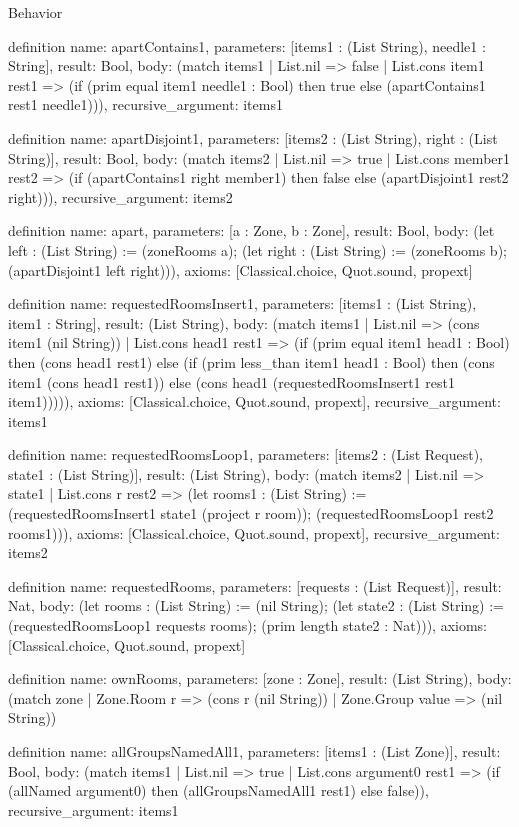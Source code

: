 \begin{lexlean}{Behavior}
\begin{semanticmodule}
definition{
  name: apartContains1,
  parameters: [items1 : (List String), needle1 : String],
  result: Bool,
  body: (match items1
    | List.nil => false
    | List.cons item1 rest1 => (if (prim equal item1 needle1 : Bool) then true else (apartContains1 rest1 needle1))),
  recursive_argument: items1
}

definition{
  name: apartDisjoint1,
  parameters: [items2 : (List String), right : (List String)],
  result: Bool,
  body: (match items2
    | List.nil => true
    | List.cons member1 rest2 => (if (apartContains1 right member1) then false else (apartDisjoint1 rest2 right))),
  recursive_argument: items2
}

definition{
  name: apart,
  parameters: [a : Zone, b : Zone],
  result: Bool,
  body: (let left : (List String) := (zoneRooms a); (let right : (List String) := (zoneRooms b); (apartDisjoint1 left right))),
  axioms: [Classical.choice, Quot.sound, propext]
}

definition{
  name: requestedRoomsInsert1,
  parameters: [items1 : (List String), item1 : String],
  result: (List String),
  body: (match items1
    | List.nil => (cons item1 (nil String))
    | List.cons head1 rest1 => (if (prim equal item1 head1 : Bool) then (cons head1 rest1) else (if (prim less_than item1 head1 : Bool) then (cons item1 (cons head1 rest1)) else (cons head1 (requestedRoomsInsert1 rest1 item1))))),
  axioms: [Classical.choice, Quot.sound, propext],
  recursive_argument: items1
}

definition{
  name: requestedRoomsLoop1,
  parameters: [items2 : (List Request), state1 : (List String)],
  result: (List String),
  body: (match items2
    | List.nil => state1
    | List.cons r rest2 => (let rooms1 : (List String) := (requestedRoomsInsert1 state1 (project r room)); (requestedRoomsLoop1 rest2 rooms1))),
  axioms: [Classical.choice, Quot.sound, propext],
  recursive_argument: items2
}

definition{
  name: requestedRooms,
  parameters: [requests : (List Request)],
  result: Nat,
  body: (let rooms : (List String) := (nil String); (let state2 : (List String) := (requestedRoomsLoop1 requests rooms); (prim length state2 : Nat))),
  axioms: [Classical.choice, Quot.sound, propext]
}

definition{
  name: ownRooms,
  parameters: [zone : Zone],
  result: (List String),
  body: (match zone | Zone.Room r => (cons r (nil String)) | Zone.Group value => (nil String))
}

definition{
  name: allGroupsNamedAll1,
  parameters: [items1 : (List Zone)],
  result: Bool,
  body: (match items1
    | List.nil => true
    | List.cons argument0 rest1 => (if (allNamed argument0) then (allGroupsNamedAll1 rest1) else false)),
  recursive_argument: items1
}


\end{semanticmodule}
\end{lexlean}
